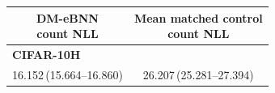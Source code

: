 \begin{tabular}{cc}
\toprule
\shortstack{DM-eBNN\\count NLL} & \shortstack{Mean matched control\\count NLL} \\
\midrule
\multicolumn{2}{l}{\textbf{CIFAR-10H}} \\
16.152\,(15.664--16.860) & 26.207\,(25.281--27.394) \\
\bottomrule
\end{tabular}
